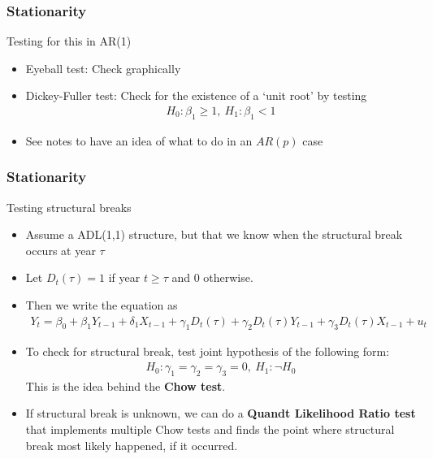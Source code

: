 \begin{frame}
\frametitle{Stationarity}
Testing for this in AR(1)
\begin{itemize}
\item Eyeball test: Check graphically
\item Dickey-Fuller test: Check for the existence of a `unit root' by testing
\begin{align*}
H_{0}: \beta_{1}\geq 1,\ H_{1} : \beta_{1}<1 
\end{align*}
\item See notes to have an idea of what to do in an $AR(p)$ case
\end{itemize}
\end{frame}


\begin{frame}
\frametitle{Stationarity}
Testing structural breaks
\begin{itemize}
\item Assume a ADL(1,1) structure, but that we know when the structural break occurs at year $\tau$ 
\item Let $D_t(\tau)=1$ if year $t\geq\tau$ and 0 otherwise. 
\item Then we write the equation as
\begin{align*}
Y_t = \beta_{0} +\beta_{1}Y_{t-1}+\delta_{1} X_{t-1} + \gamma_{1} D_t(\tau)+\gamma_2 D_t(\tau)Y_{t-1}+\gamma_3 D_t(\tau)X_{t-1}+u_t
\end{align*}
\item To check for structural break, test joint hypothesis of the following form:
\begin{align*}
H_{0}: \gamma_{1} = \gamma_2 = \gamma_3 =0, \ H_{1}: \lnot H_{0}
\end{align*}
This is the idea behind the \textbf{Chow test}. 
\item If structural break is unknown, we can do a \textbf{Quandt Likelihood Ratio test} that implements multiple Chow tests and finds the point where structural break most likely happened, if it occurred.  
\end{itemize}
\end{frame}


